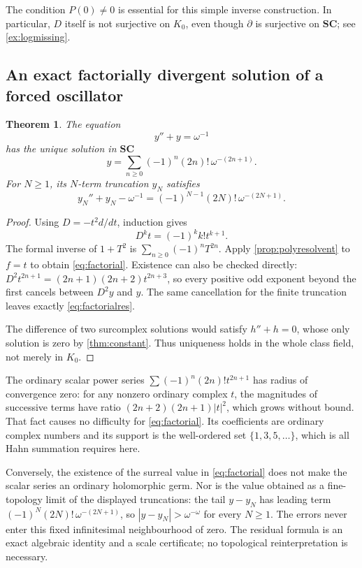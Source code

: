 \documentclass[11pt,letterpaper]{article}
\numberwithin{equation}{section}
\newtheorem{theorem}{Theorem}[section]
\theoremstyle{definition}
\theoremstyle{remark}
\newcommand{\SC}{\mathbf{SC}}
\newcommand{\der}{\partial}
\begin{document}
The condition $P(0)\ne0$ is essential for this simple inverse construction. In particular, $D$ itself is not surjective on $K_0$, even though $\der$ is surjective on $\SC$; see \cref{ex:logmissing}.

\subsection{An exact factorially divergent solution of a forced oscillator}
\begin{theorem}\label{thm:factorial}
The equation
\begin{equation}\label{eq:forcedosc}
 y''+y=\omega^{-1}
\end{equation}
has the unique solution in $\SC$
\begin{equation}\label{eq:factorial}
 y=\sum_{n\geq0}(-1)^n(2n)!\,\omega^{-(2n+1)}.
\end{equation}
For $N\geq1$, its $N$-term truncation $y_N$ satisfies
\begin{equation}\label{eq:factorialres}
 y_N''+y_N-\omega^{-1}
 =(-1)^{N-1}(2N)!\,\omega^{-(2N+1)}.
\end{equation}
\end{theorem}
\begin{proof}
Using $D=-t^2d/dt$, induction gives
\[
 D^kt=(-1)^kk!t^{k+1}.
\]
The formal inverse of $1+T^2$ is $\sum_{n\geq0}(-1)^nT^{2n}$. Apply \cref{prop:polyresolvent} to $f=t$ to obtain \eqref{eq:factorial}. Existence can also be checked directly: $D^2t^{2n+1}=(2n+1)(2n+2)t^{2n+3}$, so every positive odd exponent beyond the first cancels between $D^2y$ and $y$. The same cancellation for the finite truncation leaves exactly \eqref{eq:factorialres}.

The difference of two surcomplex solutions would satisfy $h''+h=0$, whose only solution is zero by \cref{thm:constant}. Thus uniqueness holds in the whole class field, not merely in $K_0$.
\end{proof}

The ordinary scalar power series $\sum(-1)^n(2n)!t^{2n+1}$ has radius of convergence zero: for any nonzero ordinary complex $t$, the magnitudes of successive terms have ratio $(2n+2)(2n+1)|t|^2$, which grows without bound. That fact causes no difficulty for \eqref{eq:factorial}. Its coefficients are ordinary complex numbers and its support is the well-ordered set $\{1,3,5,\ldots\}$, which is all Hahn summation requires here.

Conversely, the existence of the surreal value in \eqref{eq:factorial} does not make the scalar series an ordinary holomorphic germ. Nor is the value obtained as a fine-topology limit of the displayed truncations: the tail $y-y_N$ has leading term $(-1)^N(2N)!\,\omega^{-(2N+1)}$, so $|y-y_N|>\omega^{-\omega}$ for every $N\geq1$. The errors never enter this fixed infinitesimal neighbourhood of zero. The residual formula is an exact algebraic identity and a scale certificate; no topological reinterpretation is necessary.
\end{document}
